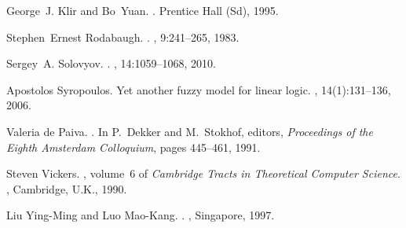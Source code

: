 \documentclass[11pt]{article}
\begin{document}
\begin{thebibliography}{10}
George~J. Klir and Bo~Yuan.
.
\newblock Prentice Hall (Sd), 1995.

Stephen~Ernest Rodabaugh.
.
, 9:241--265, 1983.

Sergey~A. Solovyov.
.
, 14:1059--1068, 2010.

Apostolos Syropoulos.
\newblock Yet another fuzzy model for linear logic.
, 14(1):131--136, 2006.

{Valeria de Paiva}.
.
\newblock In P.~Dekker and M.~Stokhof, editors, {\em Proceedings of the Eighth
  Amsterdam Colloquium}, pages 445--461, 1991.

Steven Vickers.
, volume~6 of {\em {Cambridge Tracts in
  Theoretical Computer Science}}.
, {Cambridge, U.K.}, 1990.

Liu Ying-Ming and Luo Mao-Kang.
.
, {Singapore}, 1997.

\end{thebibliography}
\end{document}
